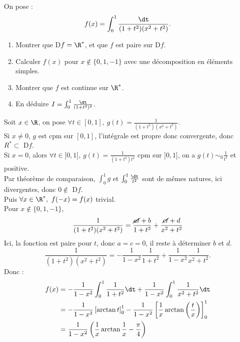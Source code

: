 \documentclass[11pt]{article}
\begin{document}
\pagebreak

\begin{ex}{}{}
    On pose :
    \begin{equation*}
        f(x) = \int_0^1\frac{\dt}{(1+t^2)(x^2+t^2)}.
    \end{equation*}
    \begin{enumerate}
        \item Montrer que D$f=\R^*$, et que $f$ est paire sur D$f$.
        \item Calculer $f(x)$ pour $x\notin\{0,1,-1\}$ avec une décomposition en éléments simples.
        \item Montrer que $f$ est continue sur $\R^*$.
        \item En déduire $I=\int_0^1\frac{\dt}{(1+t^2)^2}$.
    \end{enumerate}
    \tcblower
     Soit $x\in\R$, on pose $\forall t \in [0,1], ~ g(t)=\frac{1}{(1+t^2)(x^2+t^2)}$.\\
    Si $x\neq0$, $g$ est cpm sur $[0,1]$, l'intégrale est propre donc convergente, donc $R^*\subset$ D$f$.\\
    Si $x=0$, alors $\forall t \in ]0,1], ~ g(t)=\frac{1}{(1+t^2)t^2}$ cpm sur $]0,1]$, on a $g(t)\sim_0\frac{1}{t^2}$ et positive.\\
    Par théorème de comparaison, $\int_0^1 g$ et $\int_0^1\frac{\dt}{t^2}$ sont de mêmes natures, ici divergentes, donc $0\notin$ D$f$.\\
    Puis $\forall x \in \R^*, ~ f(-x)=f(x)$ trivial.\\
     Pour $x\notin\{0,1,-1\}$, 
    \begin{equation*}
        \frac{1}{(1+t^2)(x^2+t^2)}= \frac{\cancel{at}+b}{1+t^2} + \frac{\cancel{ct}+d}{x^2+t^2}
    \end{equation*}
    Ici, la fonction est paire pour $t$, donc $a=c=0$, il reste à déterminer $b$ et $d$.
    \begin{equation*}
        \frac{1}{(1+t^2)(x^2+t^2)} = - \frac{1}{1-x^2}\frac{1}{1+t^2} + \frac{1}{1-x^2}\frac{1}{x^2+t^2}.
    \end{equation*}
    Donc :
    \begin{align*}
        f(x) &= - \frac{1}{1-x^2}\int_0^1\frac{1}{1+t^2}\dt + \frac{1}{1-x^2}\int_0^1\frac{1}{x^2+t^2}\dt \\
        &= - \frac{1}{1-x^2}\left[ \arctan t \right]_0^1 - \frac{1}{1-x^2}\left[ \frac{1}{x}\arctan\left( \frac{t}{x} \right)\right]_0^1\\
        &= \frac{1}{1-x^2}\left( \frac{1}{x}\arctan\frac{1}{x}-\frac{\pi}{4} \right)

\end{align*}
\end{ex}
\end{document}
